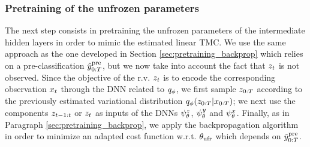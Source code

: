 \subsubsection{Pretraining of the unfrozen parameters}
\label{tmc-unfrozen}
The next step consists in pretraining
the unfrozen parameters of the intermediate hidden layers in order to mimic the
estimated linear TMC.
We use the same approach as the one developed in Section
\ref{sec:pretraining_backprop}
which relies on a pre-classification $\hat{y}_{0:T}^{\rm pre}$, but we now take into account the fact
that $z_t$ is not observed.
Since the objective of the r.v. $z_t$ is 
to encode the corresponding observation $x_t$ through the DNN related to $q_\phi$,
we first sample $z_{0:T}$ according to the 
previously estimated variational distribution
$q_\phi(z_{0:T}|x_{0:T})$;
we next use the components $z_{t-1:t}$ or $z_t$ 
as inputs of the DNNs $\psi^{z}_{\theta}$, $\psi^{y}_{\theta}$ and $\psi^{x}_{\theta}$.
Finally, as in Paragraph \ref{sec:pretraining_backprop}, we apply 
the backpropagation algorithm in order
to minimize an adapted cost function w.r.t.
$\theta_{\rm ufr}$
which depends on $\hat{y}_{0:T}^{\rm pre}$.
